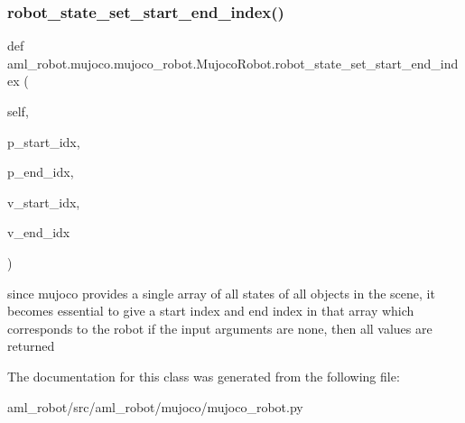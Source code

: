 \subsubsection{\texorpdfstring{robot\+\_\+state\+\_\+set\+\_\+start\+\_\+end\+\_\+index()}{robot\_state\_set\_start\_end\_index()}}
{\footnotesize\ttfamily def aml\+\_\+robot.\+mujoco.\+mujoco\+\_\+robot.\+Mujoco\+Robot.\+robot\+\_\+state\+\_\+set\+\_\+start\+\_\+end\+\_\+index (\begin{DoxyParamCaption}\item[{}]{self,  }\item[{}]{p\+\_\+start\+\_\+idx,  }\item[{}]{p\+\_\+end\+\_\+idx,  }\item[{}]{v\+\_\+start\+\_\+idx,  }\item[{}]{v\+\_\+end\+\_\+idx }\end{DoxyParamCaption})}

\begin{DoxyVerb}since mujoco provides a single array of all states of all objects in the scene, it becomes essential
to give a start index and end index in that array which corresponds to the robot
if the input arguments are none, then all values are returned
\end{DoxyVerb}
 

The documentation for this class was generated from the following file\+:\begin{DoxyCompactItemize}
\item 
aml\+\_\+robot/src/aml\+\_\+robot/mujoco/mujoco\+\_\+robot.\+py\end{DoxyCompactItemize}
